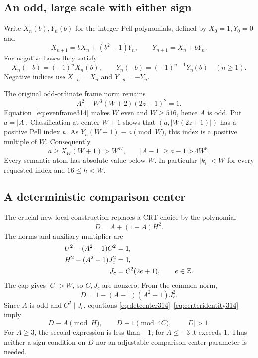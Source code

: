\subsection{An odd, large scale with either sign}

Write $X_n(b),Y_n(b)$ for the integer Pell polynomials, defined by
$X_0=1,Y_0=0$ and
\[
 X_{n+1}=bX_n+(b^2-1)Y_n,
 \qquad Y_{n+1}=X_n+bY_n.
\]
For negative bases they satisfy
\[
 X_n(-b)=(-1)^nX_n(b),\qquad
 Y_n(-b)=(-1)^{n-1}Y_n(b)\quad(n\ge1).
\]
Negative indices use $X_{-n}=X_n$ and $Y_{-n}=-Y_n$.

The original odd-ordinate frame norm remains
\begin{equation}\label{eq:framenorm314}
 A^2-W^3(W+2)(2z+1)^2=1.
\end{equation}
Equation~\eqref{eq:evenframe314} makes $W$ even and $W\ge516$, hence
$A$ is odd. Put $a=|A|$. Classification at center $W+1$ shows that
$(a,|W(2z+1)|)$ has a positive Pell index $n$. As
$Y_n(W+1)\equiv n\pmod W$, this index is a positive multiple of $W$.
Consequently
\begin{equation}\label{eq:scale314}
 a\ge X_W(W+1)>W^W,
 \qquad |A-1|\ge a-1>4W^3.
\end{equation}
Every semantic atom has absolute value below $W$. In particular
$|k_i|<W$ for every requested index and $16\le h<W$.

\subsection{A deterministic comparison center}

The crucial new local construction replaces a CRT choice by the
polynomial
\begin{equation}\label{eq:detcenter314}
 \boxed{D=A+(1-A)H^2.}
\end{equation}
The norms and auxiliary multiplier are
\begin{align}
 U^2-(A^2-1)C^2&=1,\label{eq:anchornorm314}\\
 H^2-(A^2-1)J_c^2&=1,\label{eq:commonnorm314}\\
 J_c&=C^2(2e+1),\qquad e\in\mathbb Z.\label{eq:oddaux314}
\end{align}
The cap gives $|C|>W$, so $C,J_c$ are nonzero. From the common norm,
\begin{equation}\label{eq:centeridentity314}
 D=1-(A-1)(A^2-1)J_c^2.
\end{equation}
Since $A$ is odd and $C^2\mid J_c$, equations
\eqref{eq:detcenter314}--\eqref{eq:centeridentity314} imply
\begin{equation}\label{eq:centerresidues314}
 D\equiv A\pmod H,\qquad D\equiv1\pmod{4C},\qquad |D|>1.
\end{equation}
For $A\ge3$, the second expression is less than $-1$; for $A\le-3$
it exceeds 1. Thus neither a sign condition on $D$ nor an adjustable
comparison-center parameter is needed.

